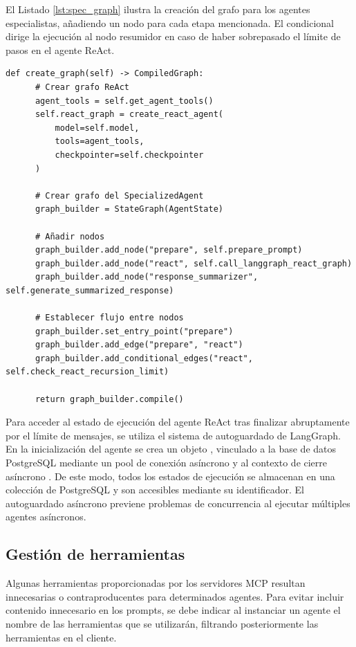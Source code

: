 El Listado \ref{lst:spec_graph} ilustra la creación del grafo para los agentes especialistas, añadiendo un nodo para cada etapa mencionada. El condicional  dirige la ejecución al nodo resumidor en caso de haber sobrepasado el límite de pasos en el agente ReAct.

\begin{lstlisting}[caption={\protect\opus{create_graph}: grafo de agentes especializados},label={lst:spec_graph}]
  def create_graph(self) -> CompiledGraph:
      # Crear grafo ReAct
      agent_tools = self.get_agent_tools()
      self.react_graph = create_react_agent(
          model=self.model,
          tools=agent_tools,
          checkpointer=self.checkpointer
      )

      # Crear grafo del SpecializedAgent
      graph_builder = StateGraph(AgentState)

      # Añadir nodos 
      graph_builder.add_node("prepare", self.prepare_prompt)
      graph_builder.add_node("react", self.call_langgraph_react_graph)
      graph_builder.add_node("response_summarizer", self.generate_summarized_response)

      # Establecer flujo entre nodos 
      graph_builder.set_entry_point("prepare")
      graph_builder.add_edge("prepare", "react")
      graph_builder.add_conditional_edges("react", self.check_react_recursion_limit)

      return graph_builder.compile()
\end{lstlisting}

Para acceder al estado de ejecución del agente ReAct tras finalizar abruptamente por el límite de mensajes, se utiliza el sistema de autoguardado de LangGraph. En la inicialización del agente se crea un objeto , vinculado a la base de datos PostgreSQL mediante un pool de conexión asíncrono y al contexto de cierre asíncrono . De este modo, todos los estados de ejecución se almacenan en una colección de PostgreSQL y son accesibles mediante su identificador. El autoguardado asíncrono previene problemas de concurrencia al ejecutar múltiples agentes asíncronos.

\subsection{Gestión de herramientas}
Algunas herramientas proporcionadas por los servidores MCP resultan innecesarias o contraproducentes para determinados agentes. Para evitar incluir contenido innecesario en los prompts, se debe indicar al instanciar un agente el nombre de las herramientas que se utilizarán, filtrando posteriormente las herramientas en el cliente.

